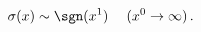 \begin{equation}
 \sigma(x) \sim \sgn(x^1) \hspace{3ex} (x^0 \to \infty)\,.
	\label{asymsigma}
\end{equation}

